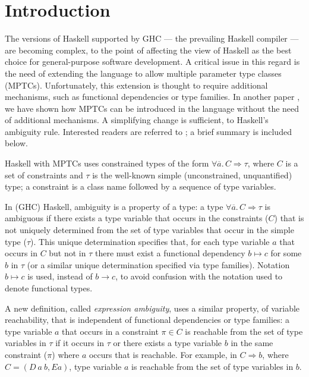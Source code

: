 \section{Introduction}
\label{sec:intro}

The versions of Haskell supported by GHC --- the prevailing Haskell
compiler --- are becoming complex, to the point of affecting the view
of Haskell as the best choice for general-purpose software
development. A critical issue in this regard is the need of extending
the language to allow multiple parameter type classes
(MPTCs). Unfortunately, this extension is thought to require
additional mechanisms, such as functional dependencies or type
families. In another paper
\cite{JBCS-Ambiguity-and-constrained-polymorphism}, we have shown how
MPTCs can be introduced in the language without the need of additional
mechanisms. A simplifying change is sufficient, to Haskell's ambiguity
rule. Interested readers are referred to
\cite{JBCS-Ambiguity-and-constrained-polymorphism}; a brief summary is
included below.

Haskell with MPTCs uses constrained types of the form $\forall
\overline{a}.\,C \Rightarrow \tau$, where $C$ is a set of constraints
and $\tau$ is the well-known simple (unconstrained, unquantified)
type; a constraint is a class name followed by a sequence of type
variables.

In (GHC) Haskell, ambiguity is a property of a type: a type $\forall
\overline{a}.\,C \Rightarrow \tau$ is ambiguous if there exists a type
variable that occurs in the constraints ($C$) that is not uniquely
determined from the set of type variables that occur in the simple
type ($\tau$). This unique determination specifies that, for each type
variable $a$ that occurs in $C$ but not in $\tau$ there must exist a
functional dependency $b \mapsto c$ for some $b$ in $\tau$ (or a
similar unique determination specified via type families). Notation $b
\mapsto c$ is used, instead of $b \rightarrow c$, to avoid confusion
with the notation used to denote functional types.

A new definition, called {\em expression ambiguity\/}, uses a similar
property, of variable reachability, that is independent of functional
dependencies or type families: a type variable $a$ that occurs in a
constraint $\pi \in C$ is reachable from the set of type variables in
$\tau$ if it occurs in $\tau$ or there exists a type variable $b$ in
the same constraint ($\pi$) where $a$ occurs that is reachable. For
example, in $C \Rightarrow b$, where $C = (D\: a\: b, E a)$, type
variable $a$ is reachable from the set of type variables in $b$.

